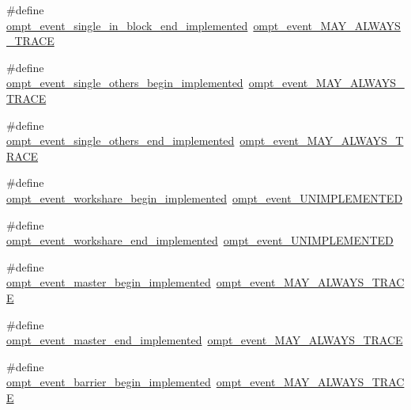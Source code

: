 \begin{DoxyCompactItemize}
\#define \hyperlink{ompt-event-specific_8h_a7d4d53915945bd562edb8cd5cd41633c}{ompt\-\_\-event\-\_\-single\-\_\-in\-\_\-block\-\_\-end\-\_\-implemented}~\hyperlink{ompt-event-specific_8h_a81d63d53ff090774864cdd033effe56e}{ompt\-\_\-event\-\_\-\-M\-A\-Y\-\_\-\-A\-L\-W\-A\-Y\-S\-\_\-\-T\-R\-A\-C\-E}
\item 
\#define \hyperlink{ompt-event-specific_8h_a42a6b224b8a6f478ec7db11cef8789f9}{ompt\-\_\-event\-\_\-single\-\_\-others\-\_\-begin\-\_\-implemented}~\hyperlink{ompt-event-specific_8h_a81d63d53ff090774864cdd033effe56e}{ompt\-\_\-event\-\_\-\-M\-A\-Y\-\_\-\-A\-L\-W\-A\-Y\-S\-\_\-\-T\-R\-A\-C\-E}
\item 
\#define \hyperlink{ompt-event-specific_8h_a1e37416b2e0c1b2e5b9a79d98e660e85}{ompt\-\_\-event\-\_\-single\-\_\-others\-\_\-end\-\_\-implemented}~\hyperlink{ompt-event-specific_8h_a81d63d53ff090774864cdd033effe56e}{ompt\-\_\-event\-\_\-\-M\-A\-Y\-\_\-\-A\-L\-W\-A\-Y\-S\-\_\-\-T\-R\-A\-C\-E}
\item 
\#define \hyperlink{ompt-event-specific_8h_a829fe75c89308c1b6e8f3b4436400040}{ompt\-\_\-event\-\_\-workshare\-\_\-begin\-\_\-implemented}~\hyperlink{ompt-event-specific_8h_a5719430a79b410eee8d68fcec0fbf8f2}{ompt\-\_\-event\-\_\-\-U\-N\-I\-M\-P\-L\-E\-M\-E\-N\-T\-E\-D}
\item 
\#define \hyperlink{ompt-event-specific_8h_a53322076dea4504077de34b9eab73aaa}{ompt\-\_\-event\-\_\-workshare\-\_\-end\-\_\-implemented}~\hyperlink{ompt-event-specific_8h_a5719430a79b410eee8d68fcec0fbf8f2}{ompt\-\_\-event\-\_\-\-U\-N\-I\-M\-P\-L\-E\-M\-E\-N\-T\-E\-D}
\item 
\#define \hyperlink{ompt-event-specific_8h_a3bade306ef69896fb63fdf64a256977c}{ompt\-\_\-event\-\_\-master\-\_\-begin\-\_\-implemented}~\hyperlink{ompt-event-specific_8h_a81d63d53ff090774864cdd033effe56e}{ompt\-\_\-event\-\_\-\-M\-A\-Y\-\_\-\-A\-L\-W\-A\-Y\-S\-\_\-\-T\-R\-A\-C\-E}
\item 
\#define \hyperlink{ompt-event-specific_8h_abd67f196b736d3e3481f7d8180a9e39d}{ompt\-\_\-event\-\_\-master\-\_\-end\-\_\-implemented}~\hyperlink{ompt-event-specific_8h_a81d63d53ff090774864cdd033effe56e}{ompt\-\_\-event\-\_\-\-M\-A\-Y\-\_\-\-A\-L\-W\-A\-Y\-S\-\_\-\-T\-R\-A\-C\-E}
\item 
\#define \hyperlink{ompt-event-specific_8h_a3d5bc5fa84dd329c1a76c72d3d1012f3}{ompt\-\_\-event\-\_\-barrier\-\_\-begin\-\_\-implemented}~\hyperlink{ompt-event-specific_8h_a81d63d53ff090774864cdd033effe56e}{ompt\-\_\-event\-\_\-\-M\-A\-Y\-\_\-\-A\-L\-W\-A\-Y\-S\-\_\-\-T\-R\-A\-C\-E}
\item 

\end{DoxyCompactItemize}
